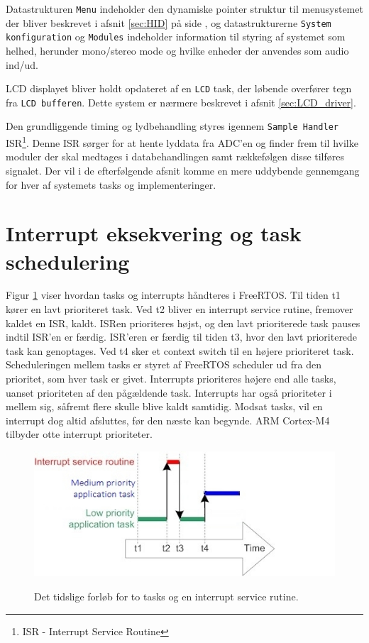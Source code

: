 Datastrukturen \texttt{Menu} indeholder den dynamiske pointer struktur til menusystemet der bliver beskrevet i afsnit \ref{sec:HID} på side \pageref{sec:HID}, og datastrukturerne \texttt{System konfiguration} og \texttt{Modules} indeholder information til styring af systemet som helhed, herunder mono/stereo mode og hvilke enheder der anvendes som audio ind/ud.

LCD displayet bliver holdt opdateret af en \texttt{LCD} task, der løbende overfører tegn fra \texttt{LCD bufferen}. Dette system er nærmere beskrevet i afsnit \ref{sec:LCD_driver}.

Den grundliggende timing og lydbehandling styres igennem \texttt{Sample Handler} ISR\footnote{ISR - Interrupt Service Routine}.
Denne ISR sørger for at hente lyddata fra ADC'en og finder frem til hvilke moduler der skal medtages i databehandlingen samt rækkefølgen disse tilføres signalet. %
Der vil i de efterfølgende afsnit komme en mere uddybende gennemgang for hver af systemets tasks og implementeringer. 


\section{Interrupt eksekvering og task schedulering}
\label{subsec:int_task}
Figur \ref{fig:int_task} viser hvordan tasks og interrupts håndteres i FreeRTOS. 
Til tiden t1 kører en lavt prioriteret task. 
Ved t2 bliver en interrupt service rutine, fremover kaldet en ISR, kaldt. 
ISRen prioriteres højst, og den lavt prioriterede task pauses indtil ISR'en er færdig.
ISR'eren er færdig til tiden t3, hvor den lavt prioriterede task kan genoptages.
Ved t4 sker et context switch til en højere prioriteret task.
Scheduleringen mellem tasks er styret af FreeRTOS scheduler ud fra den prioritet, som hver task er givet. 
Interrupts prioriteres højere end alle tasks, uanset prioriteten af den pågældende task. 
Interrupts har også prioriteter i mellem sig, såfremt flere skulle blive kaldt samtidig. 
Modsat tasks, vil en interrupt dog altid afsluttes, før den næste kan begynde. 
ARM Cortex-M4 tilbyder otte interrupt prioriteter. 
\begin{figure}[h]
	\caption{Det tidslige forløb for to tasks og en interrupt service rutine. }
	\centering
	\includegraphics[width=0.6\linewidth]{billeder/interruptandtaskprocessing.jpg}
	\label{fig:int_task}
\end{figure}


